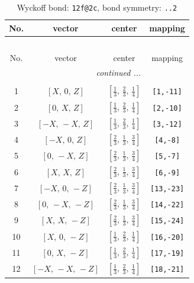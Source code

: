 \documentclass[fleqn,8pt]{jsarticle}
\begin{document}
\renewcommand{\arraystretch}{1.2}
\begin{longtable}{cccc}
\caption{Wyckoff bond: {\tt 12f@2c}, bond symmetry: {\tt ..2}}
 \\
 \hline \hline
No. & vector & center & mapping \\ \hline \endfirsthead

\multicolumn{3}{l}{\tablename\ \thetable{}} \\
 \hline \hline
No. & vector & center & mapping \\ \hline \endhead

 \hline \hline
\multicolumn{3}{r}{\footnotesize\it continued ...} \\ \endfoot

 \hline \hline
\multicolumn{3}{r}{} \\ \endlastfoot

1 & $\left[ X,\, 0,\, Z \right]$ & $\left[ \frac{1}{3},\, \frac{2}{3},\, \frac{1}{4} \right]$ & {\tt [1,-11]} \\ \hline
2 & $\left[ 0,\, X,\, Z \right]$ & $\left[ \frac{1}{3},\, \frac{2}{3},\, \frac{1}{4} \right]$ & {\tt [2,-10]} \\ \hline
3 & $\left[ - X,\, - X,\, Z \right]$ & $\left[ \frac{1}{3},\, \frac{2}{3},\, \frac{1}{4} \right]$ & {\tt [3,-12]} \\ \hline
4 & $\left[ - X,\, 0,\, Z \right]$ & $\left[ \frac{2}{3},\, \frac{1}{3},\, \frac{3}{4} \right]$ & {\tt [4,-8]} \\ \hline
5 & $\left[ 0,\, - X,\, Z \right]$ & $\left[ \frac{2}{3},\, \frac{1}{3},\, \frac{3}{4} \right]$ & {\tt [5,-7]} \\ \hline
6 & $\left[ X,\, X,\, Z \right]$ & $\left[ \frac{2}{3},\, \frac{1}{3},\, \frac{3}{4} \right]$ & {\tt [6,-9]} \\ \hline
7 & $\left[ - X,\, 0,\, - Z \right]$ & $\left[ \frac{2}{3},\, \frac{1}{3},\, \frac{3}{4} \right]$ & {\tt [13,-23]} \\ \hline
8 & $\left[ 0,\, - X,\, - Z \right]$ & $\left[ \frac{2}{3},\, \frac{1}{3},\, \frac{3}{4} \right]$ & {\tt [14,-22]} \\ \hline
9 & $\left[ X,\, X,\, - Z \right]$ & $\left[ \frac{2}{3},\, \frac{1}{3},\, \frac{3}{4} \right]$ & {\tt [15,-24]} \\ \hline
10 & $\left[ X,\, 0,\, - Z \right]$ & $\left[ \frac{1}{3},\, \frac{2}{3},\, \frac{1}{4} \right]$ & {\tt [16,-20]} \\ \hline
11 & $\left[ 0,\, X,\, - Z \right]$ & $\left[ \frac{1}{3},\, \frac{2}{3},\, \frac{1}{4} \right]$ & {\tt [17,-19]} \\ \hline
12 & $\left[ - X,\, - X,\, - Z \right]$ & $\left[ \frac{1}{3},\, \frac{2}{3},\, \frac{1}{4} \right]$ & {\tt [18,-21]} \\
\end{longtable}
\end{document}
